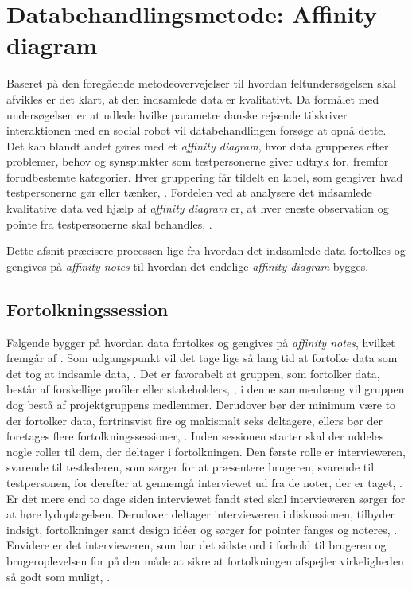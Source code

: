 \section{Databehandlingsmetode: Affinity diagram}
\label{ParametreMetodeovervejelserAffinityDiagram}
%
Baseret på den foregående metodeovervejelser til hvordan feltundersøgelsen skal afvikles er det klart, at den indsamlede data er kvalitativt. Da formålet med undersøgelsen er at udlede hvilke parametre danske rejsende tilskriver interaktionen med en social robot vil databehandlingen forsøge at opnå dette. Det kan blandt andet gøres med et \textit{affinity diagram}, hvor data grupperes efter problemer, behov og synspunkter som testpersonerne giver udtryk for, fremfor forudbestemte kategorier. Hver gruppering får tildelt en label, som gengiver hvad testpersonerne gør eller tænker, \parencite[s. 159]{Book:BuildingAnAffinity}. Fordelen ved at analysere det indsamlede kvalitative data ved hjælp af \textit{affinity diagram} er, at hver eneste observation og pointe fra testpersonerne skal behandles, \parencite[s. 25]{PDF:ConsolidationIdeationAffinity}.

Dette afsnit præcisere processen lige fra hvordan det indsamlede data fortolkes og gengives på \textit{affinity notes} til hvordan det endelige \textit{affinity diagram} bygges.

\subsection{Fortolkningssession}
\label{ParametreFortolkningssession}
%
Følgende bygger på hvordan data fortolkes og gengives på \textit{affinity notes}, hvilket fremgår af \textcite[ss. 101-122]{Book:CIInterpretationSession}. Som udgangspunkt vil det tage lige så lang tid at fortolke data som det tog at indsamle data, \parencite[s. 102]{Book:CIInterpretationSession}. Det er favorabelt at gruppen, som fortolker data, består af forskellige profiler eller stakeholders, \parencite[s. 104]{Book:CIInterpretationSession}, i denne sammenhæng vil gruppen dog bestå af projektgruppens medlemmer. Derudover bør der minimum være to der fortolker data, fortrinsvist fire og makismalt seks deltagere, ellers bør der foretages flere fortolkningssessioner, \parencite[s. 104]{Book:CIInterpretationSession}. \blankline
%
Inden sessionen starter skal der uddeles nogle roller til dem, der deltager i fortolkningen. Den første rolle er intervieweren, svarende til testlederen, som sørger for at præsentere brugeren, svarende til testpersonen, for derefter at gennemgå interviewet ud fra de noter, der er taget, \parencite[ss. 106-107]{Book:CIInterpretationSession}. Er det mere end to dage siden interviewet fandt sted skal intervieweren sørger for at høre lydoptagelsen. Derudover deltager intervieweren i diskussionen, tilbyder indsigt, fortolkninger samt design idéer og sørger for pointer fanges og noteres, \parencite[s. 107]{Book:CIInterpretationSession}. Envidere er det intervieweren, som har det sidste ord i forhold til brugeren og brugeroplevelsen for på den måde at sikre at fortolkningen afspejler virkeligheden så godt som muligt, \parencite[s. 107]{Book:CIInterpretationSession}.

